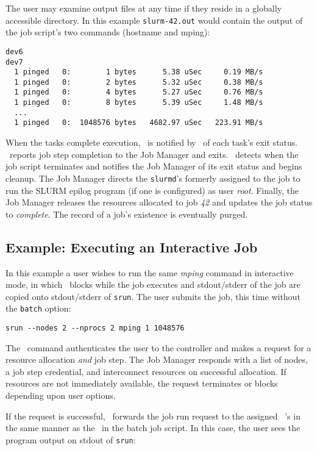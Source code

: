 \documentclass[10pt,onecolumn,times]{../common/llncs}
\begin{document}
{The user may examine output files at any time if they reside 
in a globally accessible directory. In this example
{\tt slurm-42.out} would  contain the output of the job script's two 
commands (hostname and mping):

\begin{verbatim}
dev6
dev7
  1 pinged   0:        1 bytes      5.38 uSec     0.19 MB/s                     
  1 pinged   0:        2 bytes      5.32 uSec     0.38 MB/s                     
  1 pinged   0:        4 bytes      5.27 uSec     0.76 MB/s                     
  1 pinged   0:        8 bytes      5.39 uSec     1.48 MB/s                     
  ...
  1 pinged   0:  1048576 bytes   4682.97 uSec   223.91 MB/s              
\end{verbatim}

When the tasks complete execution, \srun\ is notified by \slurmd\ of
each task's exit status. \srun\ reports job step completion to the Job
Manager and exits.  \slurmd\ detects when the job script terminates and
notifies the Job Manager of its exit status and begins cleanup.  The Job
Manager directs the {\tt slurmd}'s formerly assigned to the job to run
the SLURM epilog program (if one is configured) as user {\em root}.
Finally, the Job Manager releases the resources allocated to job {\em 42} 
and updates the job status to {\em complete}. The record of a job's
existence is eventually purged.

\subsection{Example:  Executing an Interactive Job}

In this example a user wishes to run the same {\em mping} command 
in interactive mode, in which \srun\ blocks while the job executes 
and stdout/stderr of the job are copied onto stdout/stderr of {\tt srun}.
The user submits the job, this time without the {\tt batch} option:
\begin{verbatim}
srun --nodes 2 --nprocs 2 mping 1 1048576
\end{verbatim}

The \srun\ command authenticates the user to the controller and makes a
request for a resource allocation {\em and} job step. The Job Manager
responds with a list of nodes, a job step credential, and interconnect
resources on successful allocation. If resources are not immediately
available, the request terminates or blocks depending upon user options.

If the request is successful, \srun\ forwards the job run request to
the assigned \slurmd~'s in the same manner as the \srun\ in the batch
job script. In this case, the user sees the program output on stdout of
{\tt srun}:

}
\end{document}
